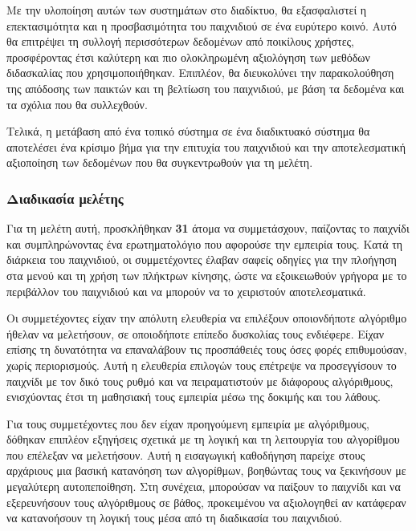 Με την υλοποίηση αυτών των συστημάτων στο διαδίκτυο, θα εξασφαλιστεί η επεκτασιμότητα και η προσβασιμότητα του παιχνιδιού σε ένα ευρύτερο κοινό. Αυτό θα επιτρέψει τη συλλογή περισσότερων δεδομένων από ποικίλους χρήστες, προσφέροντας έτσι καλύτερη και πιο ολοκληρωμένη αξιολόγηση των μεθόδων διδασκαλίας που χρησιμοποιήθηκαν. Επιπλέον, θα διευκολύνει την παρακολούθηση της απόδοσης των παικτών και τη βελτίωση του παιχνιδιού, με βάση τα δεδομένα και τα σχόλια που θα συλλεχθούν.

Τελικά, η μετάβαση από ένα τοπικό σύστημα σε ένα διαδικτυακό σύστημα θα αποτελέσει ένα κρίσιμο βήμα για την επιτυχία του παιχνιδιού και την αποτελεσματική αξιοποίηση των δεδομένων που θα συγκεντρωθούν για τη μελέτη.


\subsubsection{Διαδικασία μελέτης}

Για τη μελέτη αυτή, προσκλήθηκαν \textbf{31} άτομα να συμμετάσχουν, παίζοντας το παιχνίδι και συμπληρώνοντας ένα ερωτηματολόγιο που αφορούσε την εμπειρία τους. Κατά τη διάρκεια του παιχνιδιού, οι συμμετέχοντες έλαβαν σαφείς οδηγίες για την πλοήγηση στα μενού και τη χρήση των πλήκτρων κίνησης, ώστε να εξοικειωθούν γρήγορα με το περιβάλλον του παιχνιδιού και να μπορούν να το χειριστούν αποτελεσματικά.

Οι συμμετέχοντες είχαν την απόλυτη ελευθερία να επιλέξουν οποιονδήποτε αλγόριθμο ήθελαν να μελετήσουν, σε οποιοδήποτε επίπεδο δυσκολίας τους ενδιέφερε. Είχαν επίσης τη δυνατότητα να επαναλάβουν τις προσπάθειές τους όσες φορές επιθυμούσαν, χωρίς περιορισμούς. Αυτή η ελευθερία επιλογών τους επέτρεψε να προσεγγίσουν το παιχνίδι με τον δικό τους ρυθμό και να πειραματιστούν με διάφορους αλγόριθμους, ενισχύοντας έτσι τη μαθησιακή τους εμπειρία μέσω της δοκιμής και του λάθους.

Για τους συμμετέχοντες που δεν είχαν προηγούμενη εμπειρία με αλγόριθμους, δόθηκαν επιπλέον εξηγήσεις σχετικά με τη λογική και τη λειτουργία του αλγορίθμου που επέλεξαν να μελετήσουν. Αυτή η εισαγωγική καθοδήγηση παρείχε στους αρχάριους μια βασική κατανόηση των αλγορίθμων, βοηθώντας τους να ξεκινήσουν με μεγαλύτερη αυτοπεποίθηση. Στη συνέχεια, μπορούσαν να παίξουν το παιχνίδι και να εξερευνήσουν τους αλγόριθμους σε βάθος, προκειμένου να αξιολογηθεί αν κατάφεραν να κατανοήσουν τη λογική τους μέσα από τη διαδικασία του παιχνιδιού.

